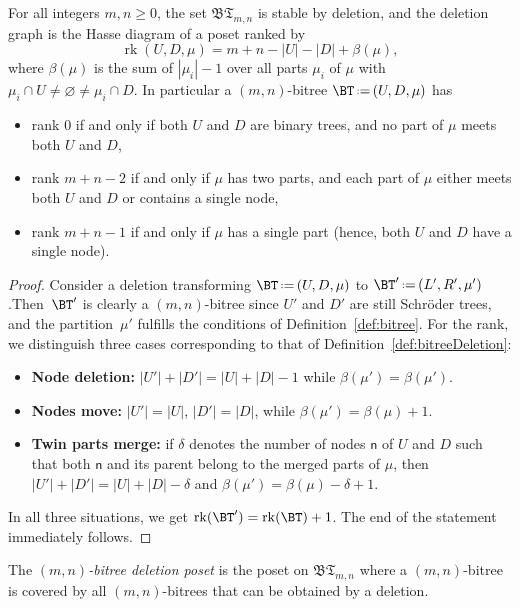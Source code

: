 \documentclass[AHL,Unicode,longabstracts,published]{cedram}
\DeclareMathOperator{\rank}{rk}
\newcommand{\f}[1]{\mathfrak{#1}}
\newcommand{\eqdef}{\mbox{\,\raisebox{0.2ex}{\scriptsize\ensuremath{\mathrm:}}\ensuremath{=}\,}}
\newcommand{\node}[1]{\mathsf{#1}}
\begin{document}
\begin{prop}\label{prop:bitreeDeletion}
For all integers $m, n \ge 0$, the set $\f{BT}_{m,n}$ is stable by deletion, and the deletion graph is the Hasse diagram of a poset ranked by
\[
\rank(U, D, \mu) = m + n - |U| - |D| + \beta(\mu),
\]
where $\beta(\mu)$ is the sum of $|\mu_i|-1$ over all parts $\mu_i$ of $\mu$ with $\mu_i \cap U \ne \varnothing \ne \mu_i \cap D$. In particular a $(m,n)$-bitree $\BT \eqdef (U, D, \mu)$ has
\begin{itemize}
\item rank $0$ if and only if both $U$ and $D$ are binary trees, and no part of $\mu$ meets both $U$ and $D$,
\item rank $m+n-2$ if and only if $\mu$ has two parts, and each part of $\mu$ either meets both $U$ and $D$ or contains a single node,
\item rank $m+n-1$ if and only if $\mu$ has a single part (hence, both $U$ and $D$ have a single node).
\end{itemize}
\end{prop}

\begin{proof}
Consider a deletion transforming ${\BT \eqdef (U, D, \mu)}$ to ${\BT' \eqdef (L', R', \mu')}$.\linebreak Then~$\BT'$ is clearly a $(m,n)$-bitree since $U'$ and $D'$ are still Schr\"oder trees, and the partition~$\mu'$ fulfills the conditions of Definition~\ref{def:bitree}. For the rank, we distinguish three cases corresponding to that of Definition~\ref{def:bitreeDeletion}:
\begin{itemize}
\item[\eqref{defi5.2.1}] \textbf{Node deletion:} $|U'| + |D'| = |U| + |D| - 1$ while $\beta(\mu') = \beta(\mu')$.
\item[\eqref{defi5.2.2}] \textbf{Nodes move:} $|U'| = |U|$, $|D'| = |D|$, while $\beta(\mu') = \beta(\mu) + 1$.
\item[\eqref{defi5.2.3}] \textbf{Twin parts merge:} if $\delta$ denotes the number of nodes $\node{n}$ of $U$ and $D$ such that both $\node{n}$ and its parent belong to the merged parts of $\mu$, then $|U'| + |D'| = |U| + |D| - \delta$ and $\beta(\mu') = \beta(\mu) - \delta + 1$.
\end{itemize}
In all three situations, we get $\rank(\BT') = \rank(\BT)+1$. The end of the statement immediately follows.
\end{proof}

\begin{defi}\label{def:bitreeDeletionPoset}
The
\emph{$(m,n)$-bitree deletion poset} is the poset on $\f{BT}_{m,n}$ where a $(m,n)$-bitree is covered by all $(m,n)$-bitrees that can be obtained by a deletion.
\end{defi}
\end{document}
